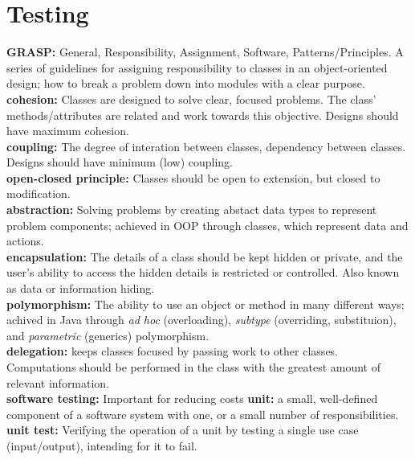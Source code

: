 \documentclass[a4paper,10pt]{article}
\begin{document}
\section {Testing}
\textcolor{RubineRed}{\textbf{GRASP:}} General, Responsibility, Assignment, Software, Patterns/Principles. A series of guidelines for assigning responsibility to classes in an object-oriented design; how to break a problem down into modules with a clear purpose. \\ 
\textcolor{RubineRed}{\textbf{cohesion:}} Classes are designed to solve clear, focused problems. The class' methods/attributes are related and work towards this objective. Designs should have maximum cohesion. \\
\textcolor{RubineRed}{\textbf{coupling: }} The degree of interation between classes, dependency between classes. Designs should have minimum (low) coupling. \\ 
\textcolor{RubineRed}{\textbf{open-closed principle:}} Classes should be open to extension, but closed to modification. \\ 
\textcolor{RubineRed}{\textbf{abstraction:}} Solving problems by creating abstact data types to represent problem components; achieved in OOP through classes, which represent data and actions. \\  
\textcolor{RubineRed}{\textbf{encapsulation:}} The details of a class should be kept hidden or private, and the user's ability to access the hidden details is restricted or controlled. Also known as data or information hiding. \\  
\textcolor{RubineRed}{\textbf{polymorphism:}} The ability to use an object or method in many different ways; achived in Java through \emph{ad hoc} (overloading), \emph{subtype} (overriding, substituion), and \emph{parametric} (generics) polymorphism. \\ 
\textcolor{RubineRed}{\textbf{delegation:}} keeps classes focused by passing work to other classes. Computations should be performed in the class with the greatest amount of relevant information. \\  
\textcolor{RubineRed}{\textbf{software testing:}} Important for reducing costs
\textcolor{RubineRed}{\textbf{unit:}} a small, well-defined component of a software system with one, or a small number of responsibilities. \\  
\textcolor{RubineRed}{\textbf{unit test:}} Verifying the operation of a unit by testing a single use case (input/output), intending for it to fail. \\  
\end{document}

